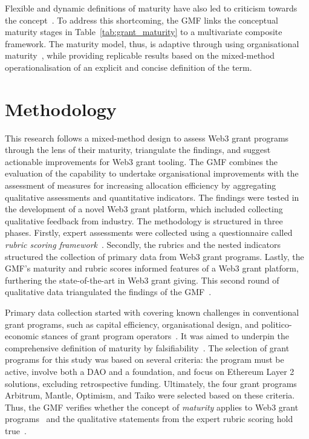 \documentclass[conference]{IEEEtran}
\begin{document}
Flexible and dynamic definitions of maturity have also led to criticism towards the concept~\cite[p.~8]{pereira_review_2020}. To address this shortcoming, the GMF links the conceptual maturity stages in Table~\ref{tab:grant_maturity} to a multivariate composite framework. The maturity model, thus, is adaptive through using organisational maturity~\cite{andersen_e-government_2006,johansson_roadmap_2019}, while providing replicable results based on the mixed-method operationalisation of an explicit and concise definition of the term.

\section{Methodology}\label{sec_3}

This research follows a mixed-method design to assess Web3 grant programs through the lens of their maturity, triangulate the findings, and suggest actionable improvements for Web3 grant tooling. The GMF combines the evaluation of the capability to undertake organisational improvements with the assessment of measures for increasing allocation efficiency by aggregating qualitative assessments and quantitative indicators. The findings were tested in the development of a novel Web3 grant platform, which included collecting qualitative feedback from industry. The methodology is structured in three phases. Firstly, expert assessments were collected using a questionnaire called \textit{rubric scoring framework}~\cite{biedermann_evaluating_2024}. Secondly, the rubrics and the nested indicators structured the collection of primary data from Web3 grant programs. Lastly, the GMF's maturity and rubric scores informed features of a Web3 grant platform, furthering the state-of-the-art in Web3 grant giving. This second round of qualitative data triangulated the findings of the GMF~\cite{creswell_designing_2017,datta_paradigm_2006}.

Primary data collection started with covering known challenges in conventional grant programs, such as capital efficiency, organisational design, and politico-economic stances of grant program operators~\cite{lerner_government_2000}. It was aimed to underpin the comprehensive definition of maturity by falsifiability~\cite[p.~17]{popper_objective_1973}. The selection of grant programs for this study was based on several criteria: the program must be active, involve both a DAO and a foundation, and focus on Ethereum Layer 2 solutions, excluding retrospective funding. Ultimately, the four grant programs Arbitrum, Mantle, Optimism, and Taiko were selected based on these criteria. Thus, the GMF verifies whether the concept of \textit{maturity} applies to Web3 grant programs~\cite[p.~7]{santos_dao_2018} and the qualitative statements from the expert rubric scoring hold true~\cite{hutton_abstraction_1990}.
\end{document}
